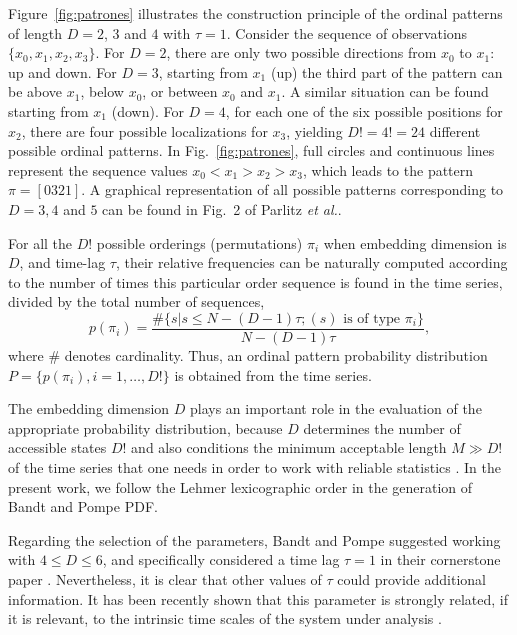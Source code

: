Figure~\ref{fig:patrones} illustrates the construction principle of the ordinal patterns of length 
$D=2$, $3$ and $4$ with $\tau = 1$\cite{Parlitz2012}.
Consider the sequence of observations $\{x_0, x_1, x_2, x_3\}$.
For $D=2$, there are only two possible directions from $x_0$ to $x_1$: up and down.
For $D=3$, starting from $x_1$ (up) the third part of the pattern can be above $x_1$, below $x_0$, or between 
$x_0$ and $x_1$.
A similar situation can be found starting from $x_1$ (down). 
For $D=4$, for each one of the six possible positions for $x_2$, there are four possible localizations for $x_3$, 
yielding $D!=4!=24$ different possible ordinal patterns.
In Fig.~\ref{fig:patrones}, full circles and continuous lines represent the sequence values 
$x_0 < x_1 > x_2 > x_3$, which leads to the pattern  $\pi=[0321]$.
A graphical representation of all possible patterns corresponding to $D = 3, 4$ and $5$
can be found in Fig.~2 of Parlitz \textit{et al.}\cite{Parlitz2012}.


For all the $D!$ possible orderings (permutations) $\pi_i$ when  embedding dimension is $D$, 
and time-lag $\tau$,
their relative 
frequencies can be naturally computed according to the number of times this particular order sequence is found 
in the time series,  divided by the total number of sequences,
\begin{equation}
\label{eq:frequ}
p(\pi_i)= \frac{\# \{s|s\leq N-(D-1)\tau ; (s)  \text{ is of type } \pi_i \}}{N-(D-1)\tau} ,
\end{equation}
where $\#$ denotes cardinality.
Thus, an ordinal pattern probability distribution $P = \{ p(\pi_i), i = 1, \dots, D! \}$ is obtained from the 
time series.

The embedding dimension $D$ plays an important role in the evaluation of the appropriate probability 
distribution, because $D$ determines the number of accessible states $D!$ and also conditions the minimum 
acceptable length $M \gg D!$ of the time series that one needs in order to work with reliable statistics 
\cite{Kowalski2007}.
In the present work, we follow the Lehmer lexicographic order \cite{Lehmer} in the generation of Bandt and 
Pompe PDF.

Regarding the selection of the parameters, Bandt and Pompe suggested working with $4 \leq D \leq 6$, and 
specifically considered a time lag $\tau = 1$ in their cornerstone paper \cite{Bandt2002}.
Nevertheless, it is clear that other values of $\tau$ could provide additional information.
It has been recently shown that this parameter is strongly related, if it is relevant, to the intrinsic 
time scales of the system under analysis \cite{Zunino2010B,Soriano2011,Zunino2012}.

